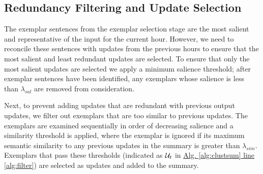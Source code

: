 \subsection{Redundancy Filtering and Update Selection}
\label{sec:upsel}

The exemplar sentences from the exemplar selection stage are the most salient
and representative of the input for the current hour. However, we need to
reconcile these sentences with updates from the previous hours to ensure that
the most salient and least redundant  updates are selected. To ensure that
only the most salient updates are selected we apply a minimum salience
threshold; after exemplar sentences have been identified, any exemplars whose
salience is less than $\lambda_{sal}$ are removed from consideration. 

Next, to prevent adding updates that are redundant with previous output
updates, we filter out exemplars that are too similar to previous updates.
The exemplars are examined sequentially in order of decreasing salience and  a
similarity threshold is applied, where the exemplar is ignored if its maximum
semantic similarity to any previous updates in the summary is greater than
$\lambda_{sim}$.  Exemplars that pass these thresholds (indicated as
$\mathcal{U}_t$ in \hyperref[alg:clustsum]{Alg. \ref{alg:clustsum} line
\ref{alg:filter}}) are selected as updates and added to the summary.
